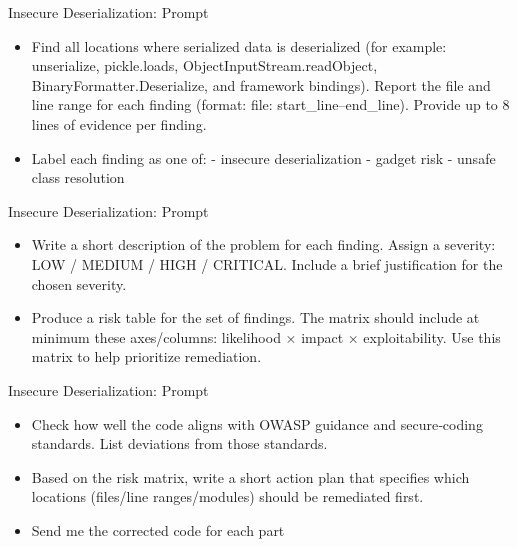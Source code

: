 \documentclass[t,ignorenonframetext]{beamer}
\begin{document}
\begin{frame}{Insecure Deserialization: Prompt}
\begin{tcolorbox}
[colback=blue!5!white,colframe=navy!75!black,title=Tasks (Part 1)]
\begin{itemize}
    \item  Find all locations where serialized data is deserialized (for example: unserialize, pickle.loads,
ObjectInputStream.readObject, BinaryFormatter.Deserialize, and framework bindings). Report the
file and line range for each finding (format: file: start_line–end_line). Provide up to 8 lines of 
evidence per finding. 
\item Label each finding as one of: - insecure deserialization - gadget risk - unsafe class resolution 
\end{itemize}
\end{tcolorbox}
\end{frame}
\begin{frame}{Insecure Deserialization: Prompt}
\begin{tcolorbox}
[colback=blue!5!white,colframe=navy!75!black,title=Tasks (Part 2)]
\begin{itemize}
    \item Write a short description of the problem for each finding. Assign a 
severity: LOW / MEDIUM / HIGH / CRITICAL. Include a brief justification for the chosen severity.
\item Produce a risk table for the set of findings. The matrix should include at minimum these
axes/columns: likelihood × impact × exploitability. Use this matrix to help prioritize remediation. 

\end{itemize}
\end{tcolorbox}
\end{frame}
\begin{frame}{Insecure Deserialization: Prompt}
\begin{tcolorbox}
[colback=blue!5!white,colframe=navy!75!black,title=Tasks (Part 3)]
\begin{itemize}
    \item Check how well the code aligns with OWASP guidance and secure‑coding standards. List deviations
from those standards.
\item Based on the risk matrix, write a short action plan that specifies which
locations (files/line ranges/modules) should be remediated first. 
\item Send me the corrected code for each part
\end{itemize}
\end{tcolorbox}
\end{frame}
\end{document}

